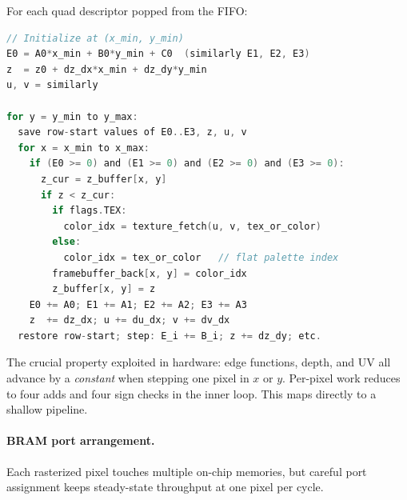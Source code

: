 \documentclass[11pt]{article}
\begin{document}
For each quad descriptor popped from the FIFO:

\begin{lstlisting}[language=C]
// Initialize at (x_min, y_min)
E0 = A0*x_min + B0*y_min + C0  (similarly E1, E2, E3)
z  = z0 + dz_dx*x_min + dz_dy*y_min
u, v = similarly

for y = y_min to y_max:
  save row-start values of E0..E3, z, u, v
  for x = x_min to x_max:
    if (E0 >= 0) and (E1 >= 0) and (E2 >= 0) and (E3 >= 0):
      z_cur = z_buffer[x, y]
      if z < z_cur:
        if flags.TEX:
          color_idx = texture_fetch(u, v, tex_or_color)
        else:
          color_idx = tex_or_color   // flat palette index
        framebuffer_back[x, y] = color_idx
        z_buffer[x, y] = z
    E0 += A0; E1 += A1; E2 += A2; E3 += A3
    z  += dz_dx; u += du_dx; v += dv_dx
  restore row-start; step: E_i += B_i; z += dz_dy; etc.
\end{lstlisting}

The crucial property exploited in hardware: edge functions, depth, and UV all advance by a \emph{constant} when stepping one pixel in $x$ or $y$. Per-pixel work reduces to four adds and four sign checks in the inner loop. This maps directly to a shallow pipeline.

\paragraph{BRAM port arrangement.} Each rasterized pixel touches multiple on-chip memories, but careful port assignment keeps steady-state throughput at one pixel per cycle.
\end{document}

